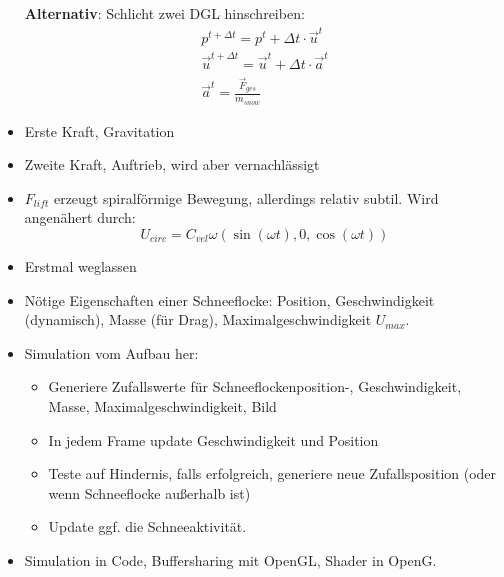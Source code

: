 \begin{itemize}
\textbf{Alternativ}: Schlicht zwei DGL hinschreiben:
\begin{gather}
p^{t + \Delta t} = p^{t} + \Delta t \cdot \vec{u}^{t} \\
\vec{u}^{t+ \Delta t} = \vec{u}^{t} + \Delta t \cdot \vec{a}^{t} \\
\vec{a}^t = \frac{\vec{F}_{ges}}{m_{snow}}
\end{gather}
\item Erste Kraft, Gravitation
\item Zweite Kraft, Auftrieb, wird aber vernachlässigt
\item $F_{lift}$ erzeugt spiralförmige Bewegung, allerdings relativ subtil. Wird angenähert durch:
\[
U_{circ} = C_{vel} \omega (\sin(\omega t),0,\cos(\omega t))
\]
\item Erstmal weglassen
\item Nötige Eigenschaften einer Schneeflocke: Position, Geschwindigkeit (dynamisch), Masse (für Drag), Maximalgeschwindigkeit $U_{max}$.
\item Simulation vom Aufbau her:
    \begin{itemize}
            \item Generiere Zufallswerte für Schneeflockenposition-,
            Geschwindigkeit, Masse, Maximalgeschwindigkeit, Bild
            \item In jedem Frame update Geschwindigkeit und Position
            \item Teste auf Hindernis, falls erfolgreich, generiere neue
            Zufallsposition (oder wenn Schneeflocke außerhalb ist)
            \item Update ggf. die Schneeaktivität.
    \end{itemize}
\item Simulation in Code, Buffersharing mit OpenGL, Shader in OpenG.
\end{itemize}